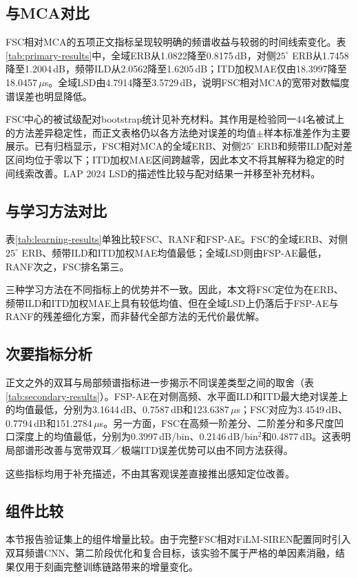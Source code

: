 \documentclass[UTF8,a4paper]{article}
\begin{document}
\subsection{与MCA对比}
FSC相对MCA的五项正文指标呈现较明确的频谱收益与较弱的时间线索变化。表\ref{tab:primary-results}中，全域ERB从1.0822降至0.8175\,dB，对侧$25^\circ$ ERB从1.7458降至1.2004\,dB，频带ILD从2.0562降至1.6205\,dB；ITD加权MAE仅由18.3997降至18.0457\,$\mu$s。全域LSD由4.7914降至3.5729\,dB，说明FSC相对MCA的宽带对数幅度谱误差也明显降低。



FSC中心的被试级配对bootstrap统计见补充材料。其作用是检验同一44名被试上的方法差异稳定性，而正文表格仍以各方法绝对误差的均值$\pm$样本标准差作为主要展示。已有归档显示，FSC相对MCA的全域ERB、对侧$25^\circ$ ERB和频带ILD配对差区间均位于零以下；ITD加权MAE区间跨越零，因此本文不将其解释为稳定的时间线索改善。LAP 2024 LSD的描述性比较与配对结果一并移至补充材料。

\subsection{与学习方法对比}
表\ref{tab:learning-results}单独比较FSC、RANF和FSP-AE。FSC的全域ERB、对侧$25^\circ$ ERB、频带ILD和ITD加权MAE均值最低；全域LSD则由FSP-AE最低，RANF次之，FSC排名第三。



三种学习方法在不同指标上的优势并不一致。因此，本文将FSC定位为在ERB、频带ILD和ITD加权MAE上具有较低均值、但在全域LSD上仍落后于FSP-AE与RANF的残差细化方案，而非替代全部方法的无代价最优解。

\subsection{次要指标分析}
\label{sec:secondary-metrics}
正文之外的双耳与局部频谱指标进一步揭示不同误差类型之间的取舍（表\ref{tab:secondary-results}）。FSP-AE在对侧高频、水平面ILD和ITD最大绝对误差上的均值最低，分别为3.1644\,dB、0.7587\,dB和123.6387\,$\mu$s；FSC对应为3.4549\,dB、0.7794\,dB和151.2784\,$\mu$s。另一方面，FSC在高频一阶差分、二阶差分和多尺度凹口深度上的均值最低，分别为0.3997\,dB/bin、0.2146\,dB/bin$^2$和0.4877\,dB。这表明局部谱形改善与宽带双耳／极端ITD误差优势可以由不同方法获得。



这些指标均用于补充描述，不由其客观误差直接推出感知定位改善。

\FloatBarrier
\subsection{组件比较}
\label{sec:ablation}
本节报告验证集上的组件增量比较。由于完整FSC相对FiLM-SIREN配置同时引入双耳频谱CNN、第二阶段优化和复合目标，该实验不属于严格的单因素消融，结果仅用于刻画完整训练链路带来的增量变化。
\end{document}
